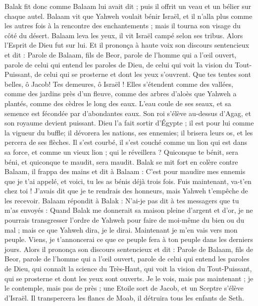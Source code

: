 \begin{multicols}{2}
Balak fit donc comme Balaam lui avait dit ; puis il offrit un veau et un bélier sur chaque autel.
\VerseOne{}Balaam vit que Yahweh voulait bénir Israël, et il n'alla plus comme les autres fois à la rencontre des enchantements ; mais il tourna son visage du côté du désert.
Balaam leva les yeux, il vit Israël campé selon ses tribus. Alors l'Esprit de Dieu fut sur lui.
Et il prononça à haute voix son discours sentencieux et dit : Parole de Balaam, fils de Beor, parole de l'homme qui a l'œil ouvert,
parole de celui qui entend les paroles de Dieu, de celui qui voit la vision du Tout-Puissant, de celui qui se prosterne et dont les yeux s’ouvrent.
Que tes tentes sont belles, ô Jacob! Tes demeures, ô Israël !
Elles s’étendent comme des vallées, comme des jardins près d'un fleuve, comme des arbres d'aloès que Yahweh a plantés, comme des cèdres le long des eaux.
L'eau coule de ses seaux, et sa semence est fécondée par d’abondantes eaux. Son roi s’élève au-dessus d’Agag, et son royaume devient puissant.
Dieu l'a fait sortir d'Égypte ; il est pour lui comme la vigueur du buffle; il dévorera les nations, ses ennemies; il brisera leurs os, et les percera de ses flèches.
Il s'est courbé, il s'est couché comme un lion qui est dans sa force, et comme un vieux lion ; qui le réveillera ? Quiconque te bénit, sera béni, et quiconque te maudit, sera maudit.
Balak se mit fort en colère contre Balaam, il frappa des mains et dit à Balaam : C’est pour maudire mes ennemis que je t’ai appelé, et voici, tu les as bénis déjà trois fois.
Fuis maintenant, va-t’en chez toi ! J'avais dit que je te rendrais des honneurs, mais Yahweh t'empêche de les recevoir.
Balaam répondit à Balak : N'ai-je pas dit à tes messagers que tu m’as envoyés :
Quand Balak me donnerait sa maison pleine d'argent et d'or, je ne pourrais transgresser l’ordre de Yahweh pour faire de moi-même du bien ou du mal ; mais ce que Yahweh dira, je le dirai.
Maintenant je m'en vais vers mon peuple. Viens, je t’annoncerai ce que ce peuple fera à ton peuple dans les derniers jours.
Alors il prononça son discours sentencieux et dit : Parole de Balaam, fils de Beor, parole de l'homme qui a l'œil ouvert,
parole de celui qui entend les paroles de Dieu, qui connaît la science du Très-Haut, qui voit la vision du Tout-Puissant, qui se prosterne et dont les yeux sont ouverts.
Je le vois, mais pas maintenant ; je le contemple, mais pas de près ; une Etoile sort de Jacob, et un Sceptre s’élève d’Israël. Il transpercera les flancs de Moab, il détruira tous les enfants de Seth.

\end{multicols}
